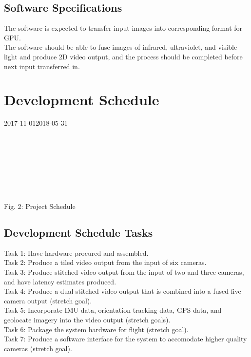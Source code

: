 \documentclass[letterpaper,10pt,serif,draftclsnofoot,onecolumn,compsoc,titlepage]{IEEEtran}
\begin{document}
\subsection{Software Specifications}
	The software is expected to transfer input images into corresponding format for GPU.\\
	The software should be able to fuse images of infrared, ultraviolet, and visible light  and produce 2D video output, and the process should be completed before next input transferred in.\\


\section{Development Schedule}
	\begin{ganttchart}
    	[hgrid, x unit=0.77mm, y unit chart=9.0mm, title label font=\normalsize, time slot format=isodate]
    	{2017-11-01}{2018-05-31}
    	\\
    	\\
    	\\
    	\\
    	\\
    	\\
    	\\
    	\\
	\end{ganttchart}
\begin{center}
	Fig. 2: Project Schedule
\end{center}	

\subsection{Development Schedule Tasks}
Task 1: Have hardware procured and assembled.\\
Task 2: Produce a tiled video output from the input of six cameras.\\
Task 3: Produce stitched video output from the input of two and three cameras, 
and have latency estimates produced.\\
Task 4: Produce a dual stitched video output that is combined into a fused 
five-camera output (stretch goal).\\
Task 5: Incorporate IMU data, orientation tracking data, GPS data, and 
geolocate imagery into the video output (stretch goals).\\
Task 6: Package the system hardware for flight (stretch goal).\\
Task 7: Produce a software interface for the system to accomodate higher 
quality cameras (stretch goal).\\
\end{document}
